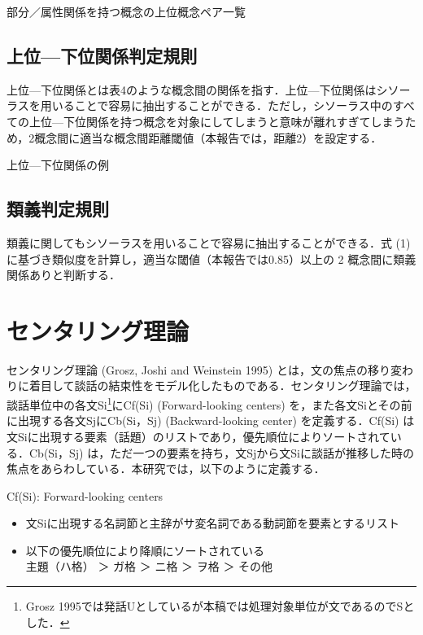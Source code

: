 \documentclass[japanese]{jnlp_1.4}
\begin{document}
\begin{table}[b]
\caption{部分／属性関係を持つ概念の上位概念ペア一覧}

\end{table}


\subsection{上位—下位関係判定規則}
\label{sec:mylabel5}

上位—下位関係とは表4のような概念間の関係を指す．上位—下位関係はシソーラスを用いることで容易に抽出することができる．ただし，シソーラス中のすべての上位—下位関係を持つ概念を対象にしてしまうと意味が離れすぎてしまうため，2概念間に適当な概念間距離閾値（本報告では，距離2）を設定する．

\begin{table}[t]
\caption{上位—下位関係の例}

\end{table}



\subsection{類義判定規則}
\label{sec:mylabel6}

類義に関してもシソーラスを用いることで容易に抽出することができる．式 (1) に基づき類似度を計算し，適当な閾値（本報告では0.85）以上の 2 概念間に類義関係ありと判断する．


\section{センタリング理論}
\label{sec:mylabel7}

センタリング理論 (Grosz, Joshi and Weinstein 1995) とは，文の焦点の移り変わりに着目して談話の結束性をモデル化したものである．センタリング理論では，談話単位中の各文Si\footnote{Grosz 1995では発話Uとしているが本稿では処理対象単位が文であるのでSとした．}にCf(Si) (Forward-looking centers) を，また各文Siとその前に出現する各文SjにCb(Si，Sj) (Backward-looking center) を定義する．Cf(Si) は文Siに出現する要素（話題）のリストであり，優先順位によりソートされている．Cb(Si，Sj) は，ただ一つの要素を持ち，文Sjから文Siに談話が推移した時の焦点をあらわしている．本研究では，以下のように定義する．
\vspace{1\baselineskip}

Cf(Si): Forward-looking centers
\begin{itemize}
\item
文Siに出現する名詞節と主辞がサ変名詞である動詞節を要素とするリスト

\item
以下の優先順位により降順にソートされている\\
主題（ハ格） ＞ ガ格 ＞ ニ格 ＞ ヲ格 ＞ その他
\end{itemize}
\end{document}
